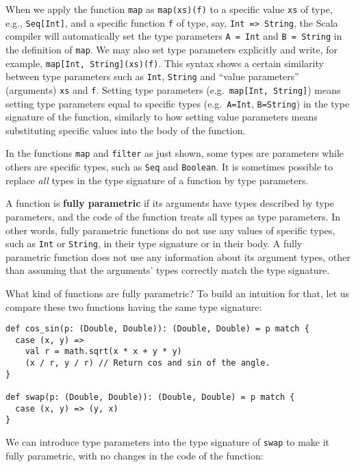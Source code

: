When we apply the function \lstinline!map! as \lstinline!map(xs)(f)!
to a specific value \lstinline!xs! of type, e.g., \lstinline!Seq[Int]!,
and a specific function \lstinline!f! of type, say, \lstinline!Int => String!,
the Scala compiler will automatically set the type parameters \lstinline!A = Int!
and \lstinline!B = String! in the definition of \lstinline!map!.
We may also set type parameters explicitly and write, for example,
\lstinline!map[Int, String](xs)(f)!. This syntax shows a certain
similarity between type parameters such as \lstinline!Int!, \lstinline!String!
and ``value parameters'' (arguments) \lstinline!xs! and \lstinline!f!.
Setting type parameters (e.g.~\lstinline!map[Int, String]!) means
setting type parameters equal to specific types (e.g.~\lstinline!A=Int!,
\lstinline!B=String!) in the type signature of the function, similarly
to how setting value parameters means substituting specific values
into the body of the function.

In the functions \lstinline!map! and \lstinline!filter! as just
shown, some types are parameters while others are specific types,
such as \lstinline!Seq! and \lstinline!Boolean!. It is sometimes
possible to replace \emph{all} types in the type signature of a function
by type parameters.

A function is \textbf{fully parametric}
if its arguments have types described by type parameters, and the
code of the function treats all types as type parameters. In other
words, fully parametric functions do not use any values of specific
types, such as \lstinline!Int! or \lstinline!String!, in their type
signature or in their body. A fully parametric function does not use
any information about its argument types, other than assuming that
the arguments' types correctly match the type signature.

What kind of functions are fully parametric? To build an intuition
for that, let us compare these two functions having the same type
signature:
\begin{lstlisting}
def cos_sin(p: (Double, Double)): (Double, Double) = p match {
  case (x, y) =>
    val r = math.sqrt(x * x + y * y)
    (x / r, y / r) // Return cos and sin of the angle.
}

def swap(p: (Double, Double)): (Double, Double) = p match {
  case (x, y) => (y, x)
}
\end{lstlisting}
We can introduce type parameters into the type signature of \lstinline!swap!
to make it fully parametric, with no changes in the code of the function:

